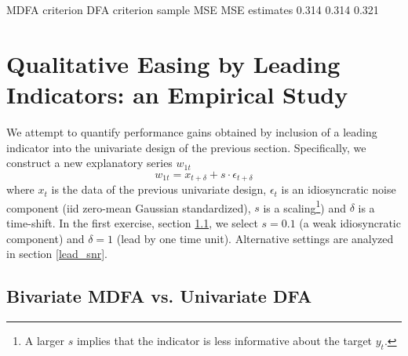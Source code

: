 \documentclass[a4paper]{book}
\begin{document}
\begin{enumerate}
\begin{Schunk}
\begin{Soutput}
              MDFA criterion DFA criterion sample MSE
MSE estimates          0.314         0.314      0.321
\end{Soutput}
\end{Schunk}
\end{enumerate}




\section{Qualitative Easing by Leading Indicators: an Empirical Study}\label{leading_ind}

We attempt to quantify performance gains obtained by inclusion of a leading indicator into the univariate design of the previous section. Specifically, we construct a new explanatory  series $w_{1t}$ 
\begin{equation}\label{def_led_i}
w_{1t}=x_{t+\delta}+s\cdot\epsilon_{t+\delta}
\end{equation}
where $x_t$ is the data of the previous univariate design, $\epsilon_t$ is an idiosyncratic noise component (iid zero-mean Gaussian standardized), $s$ is a scaling\footnote{A larger $s$ implies that the indicator is less informative about the target $y_t$.}) and $\delta$ is a time-shift. 
In the first exercise, section \ref{bimdfaudfa}, we select $s=0.1$ (a weak idiosyncratic component) and $$ (lead by one time unit). Alternative settings are analyzed in section \ref{lead_snr}.

\subsection{Bivariate MDFA vs. Univariate DFA}\label{bimdfaudfa}
\end{document}

